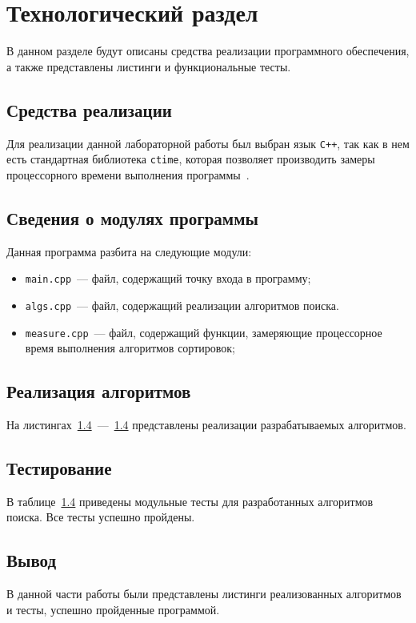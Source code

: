 \chapter{Технологический раздел}
В данном разделе будут описаны средства реализации программного обеспечения, а также представлены листинги и функциональные тесты.

\section{Средства реализации}
Для реализации данной лабораторной работы был выбран язык \texttt{C++}, так как в нем есть стандартная библиотека \texttt{ctime}, которая позволяет производить замеры процессорного времени выполнения программы~\cite{cpp-lang}. 

\section{Сведения о модулях программы}
Данная программа разбита на следующие модули:
\begin{itemize}
	\item \texttt{main.cpp}~--- файл, содержащий точку входа в программу;
	\item \texttt{algs.cpp}~--- файл, содержащий реализации алгоритмов поиска.
	\item \texttt{measure.cpp}~--- файл, содержащий функции, замеряющие процессорное время выполнения алгоритмов сортировок;
\end{itemize}
	
\section{Реализация алгоритмов}
На листингах~\ref{}~---~\ref{} представлены реализации разрабатываемых алгоритмов.

\section{Тестирование}
В таблице~\ref{} приведены модульные тесты для разработанных алгоритмов поиска. Все тесты успешно пройдены.

\section*{Вывод}
В данной части работы были представлены листинги реализованных алгоритмов и тесты, успешно пройденные программой.